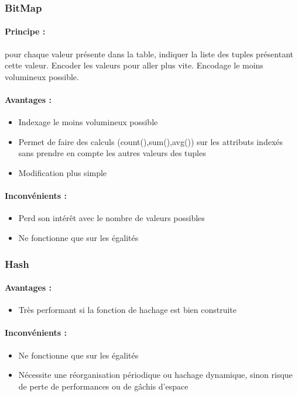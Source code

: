 \documentclass[10pt,a4paper,twoside]{article}
\begin{document}
\subsubsection{BitMap}
\paragraph{Principe :} pour chaque valeur présente dans la table, indiquer la liste des tuples présentant cette valeur. Encoder les valeurs pour aller plus vite. Encodage le moins volumineux possible.\\
\paragraph{Avantages :}
\begin{itemize}
\item Indexage le moins volumineux possible
\item Permet de faire des calculs (count(),sum(),avg()) sur les attributs indexés sans prendre en compte les autres valeurs des tuples
\item Modification plus simple
\end{itemize}
\paragraph{Inconvénients :}
\begin{itemize}
\item Perd son intérêt avec le nombre de valeurs possibles
\item Ne fonctionne que sur les égalités
\end{itemize}

\subsubsection{Hash}
\paragraph{Avantages :}
\begin{itemize}
\item Très performant si la fonction de hachage est bien construite
\end{itemize}
\paragraph{Inconvénients :}
\begin{itemize}
\item Ne fonctionne que sur les égalités
\item Nécessite une réorganisation périodique ou hachage dynamique, sinon risque de perte de performances ou de gâchis d'espace
\end{itemize}
\end{document}
